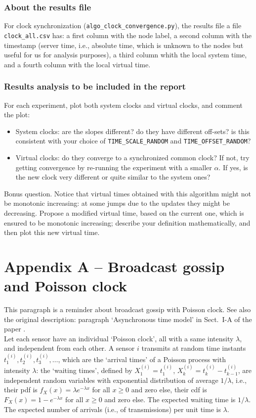 \documentclass[oneside]{article}
\begin{document}
\subsubsection{About the results file}

For clock synchronization (\verb=algo_clock_convergence.py=),
the results file
a file \verb=clock_all.csv= has:
a first column with the node label, 
a second column with the timestamp (server time, i.e., absolute time, which is unknown to the nodes but useful for us for analysis purposes), 
a third column whith the local system time, 
and a fourth column with the local virtual time.


\subsubsection{Results analysis to be included in the report}

For each experiment, plot both system clocks and virtual clocks, and comment the plot:
\begin{itemize}
	\item System clocks: are the slopes different? do they have different off-sets? is this consistent with your choice of \verb=TIME_SCALE_RANDOM= and \verb=TIME_OFFSET_RANDOM=?
	\item Virtual clocks: do they converge to a synchronized common clock? If not, try getting convergence by re-running the experiment with a smaller $\alpha$. If yes, is the new clock very different or quite similar to the system ones?
\end{itemize}
Bonus question. Notice that virtual times obtained with this algorithm might not be monotonic increasing: at some jumps due to the updates they might be decreasing. Propose a modified virtual time, based on the current one, which is ensured to be monotonic increasing; describe your definition mathematically, and then plot this new virtual time.


\newpage
\section*{Appendix A -- Broadcast gossip and Poisson clock}
This paragraph is a reminder about broadcast gossip with Poisson clock. See also the original description: paragraph `Asynchronous time model' in Sect.~I-A of the paper \cite{gossip-poisson}.\\

Let each sensor have an individual `Poisson clock', all with a same intensity $\lambda$, and independent from each other. A sensor $i$ transmits at random time instants $t_1^{(i)}, t_2^{(i)}, t_3^{(i)}, \dots$, which are the `arrival times' of a Poisson process with intensity $\lambda$: the `waiting times', defined by $X_1^{(i)} = t_1^{(i)}$, $X_k^{(i)} = t_k^{(i)}-t_{k-1}^{(i)}$, are independent random variables with exponential distribution of average $1/\lambda$, i.e., their pdf is $f_X(x) = \lambda e^{-\lambda x}$ for all $x \ge 0$ and zero else, their cdf is $F_X(x) = 1 - e^{-\lambda x} $ for all $x \ge 0$ and zero else. The expected waiting time is $1/\lambda$. The expected number of arrivals (i.e., of transmissions) per unit time is $\lambda$.\\
\end{document}
